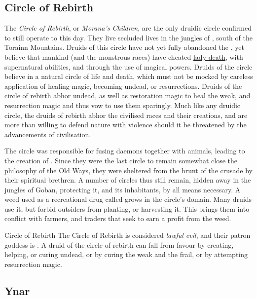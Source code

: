 \subsection{Circle of Rebirth}
\label{sec:Circle of Rebirth}

The \emph{Circle of Rebirth}, or \emph{Morana's Children}, are the only
druidic circle confirmed to still operate to this day. They live secluded
lives in the jungles of , south of the Torainn
Mountains. Druids of this circle have not yet fully abandoned the
, yet believe that mankind (and the monstrous races)
have cheated \hyperref[sec:Morana]{lady death}, with supernatural abilities,
and through the use of magical powers. Druids of the circle believe in a
natural circle of life and death, which must not be mocked by careless
application of healing magic, becoming undead, or resurrections. Druids of the
circle of rebirth abhor undead, as well as restoration magic to heal the weak,
and resurrection magic and thus vow to use them sparingly. Much like any
druidic circle, the druids of rebirth abhor the civilised races and their
creations, and are more than willing to defend nature with violence should it
be threatened by the advancements of civilisation.

The circle was responsible for fusing daemons together with animals, leading
to the creation of . Since they were the last
circle to remain somewhat close the philosophy of the Old Ways, they were
sheltered from the brunt of the crusade by their spiritual brethren. A number
of circles thus still remain, hidden away in the jungles of Goban, protecting
it, and its inhabitants, by all means necessary. A weed used as a recreational
drug called  grows in the circle's domain. Many druids
use it, but forbid outsiders from planting, or harvesting it. This brings them
into conflict with farmers, and traders that seek to earn a profit from the
weed.

\begin{35e}{Circle of Rebirth}
  The Circle of Rebirth is considered \emph{lawful evil}, and their patron
  goddess is . A druid of the circle of rebirth can fall
  from favour by creating, helping, or curing undead, or by curing the weak
  and the frail, or by attempting resurrection magic.
\end{35e}

\subsection{Ynar}
\label{sec:Ynar}


